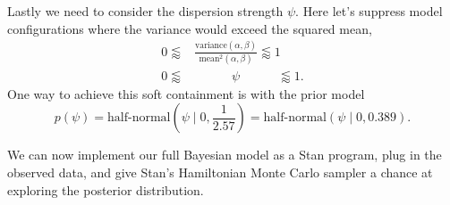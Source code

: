 \documentclass[
  letterpaper,
  DIV=11,
  numbers=noendperiod]{scrartcl}
\begin{document}
Lastly we need to consider the dispersion strength \(\psi\). Here let's
suppress model configurations where the variance would exceed the
squared mean, \begin{align*}
0 \lessapprox
&\frac{ \text{variance}(\alpha, \beta) }{ \text{mean}^{2}(\alpha, \beta) }
\lessapprox 1
\\
0 \lessapprox & \quad\quad\;\;\;\, \psi \quad\quad\;\;\;\,  \lessapprox 1.
\end{align*} One way to achieve this soft containment is with the prior
model \[
p( \psi )
= \text{half-normal} \left( \psi \mid 0, \frac{1}{2.57} \right)
= \text{half-normal} \left( \psi \mid 0, 0.389 \right).
\]

We can now implement our full Bayesian model as a Stan program, plug in
the observed data, and give Stan's Hamiltonian Monte Carlo sampler a
chance at exploring the posterior distribution.
\end{document}
